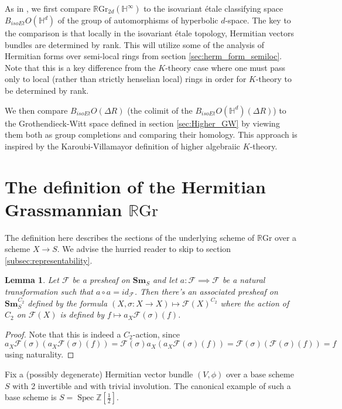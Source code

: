 \documentclass[edeposit,fullpage]{uiucthesis2009}
\newcommand{\Z}{\mathbb Z}
\newcommand{\mbb}{\mathbb}
\newcommand{\mc}{\mathcal}
\newcommand{\RGr}{\mathbb R\mathrm{Gr}}
\newcommand{\Sm}[1]{\mathbf{Sm}_{#1}}
\DeclareMathOperator{\Spec}{Spec}
\theoremstyle{plain}
\newtheorem{lemma}{Lemma}
\numberwithin{lemma}{section}
\theoremstyle{definition}
\begin{document}
As in \cite{SchTri}, we first compare $\RGr_{2d}(\mbb H^\infty)$ to the isovariant \'etale
classifying space $B_{isoEt}O(\mbb H^{d})$ of the group of automorphisms of
hyperbolic $d$-space. The key to the comparison is that locally in the
isovariant \'etale topology, Hermitian vectors bundles are determined
by rank. This will utilize some of the analysis of
Hermitian forms over semi-local rings from section
\ref{sec:herm_form_semiloc}. Note that this is a key difference from
the $K$-theory case where one must pass only to local (rather than
strictly henselian local) rings in order for $K$-theory to be
determined by rank. 

We then compare $B_{isoEt}O(\Delta R)$ (the colimit of the
$B_{isoEt}O(\mbb H^d)(\Delta R)$) to
the Grothendieck-Witt space defined in section \ref{sec:Higher_GW} by viewing them both as group completions
and comparing their homology. This approach is inspired by the
Karoubi-Villamayor definition of higher algebraiic $K$-theory. 

\section{The definition of the Hermitian Grassmannian $\RGr$}

The definition here describes the sections of the underlying scheme of
$\RGr$ over a scheme $X \rightarrow S$. We advise the hurried reader to
skip to section \ref{subsec:representability}.

\begin{lemma}\label{lem:action_presheaf}
Let $\mc F$ be a presheaf on $\Sm{S}$ and let $a : \mc F \implies
\mc F$ be a natural transformation such that $a \circ a = id_{\mc F}$. Then
there's an associated presheaf on $\Sm{S}^{C_2}$ defined by the formula
$(X,\sigma : X \rightarrow X) \mapsto \mc F(X)^{C_2}$ where the action
of $C_2$ on $\mc F(X)$ is defined by $f \mapsto  a_X\mc F(\sigma)(f)$.
\end{lemma}

\begin{proof}
Note that this is indeed a $C_2$-action, since $a_X \mc F(\sigma)(
a_X\mc F(\sigma)(f)) = \mc F(\sigma) a_X(a_X \mc F(\sigma)(f)) = \mc
F(\sigma)(\mc F(\sigma)(f)) = f$ using naturality. 
\end{proof}

Fix a (possibly degenerate) Hermitian vector bundle $(V,\phi)$ over a
base scheme $S$ with 2 invertible and with trivial
involution. The canonical example of such a base scheme is $S = \Spec \Z[\frac{1}{2}]$.
\end{document}
